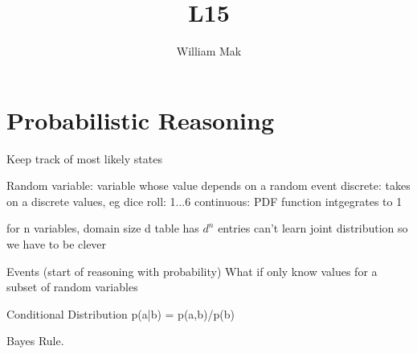 \documentclass{article}
\title{L15}
\author{William Mak}
\begin{document}
\maketitle
\section{Probabilistic Reasoning}
\begin{enumeration}
	\item Keep track of most likely states
	\item Random variable: variable whose value depends on a random event
		\subitem discrete: takes on a discrete values, eg dice roll: 1...6
		\subitem continuous: PDF function intgegrates to 1
	\item for n variables, domain size d table has $d^n$ entries
		can't learn joint distribution so we have to be clever
	\item Events (start of reasoning with probability)
		\subitem What if only know values for a subset of random variables
	\item Conditional Distribution p(a|b) = p(a,b)/p(b)
	\item Bayes Rule.
\end{enumeration}
\end{document}
